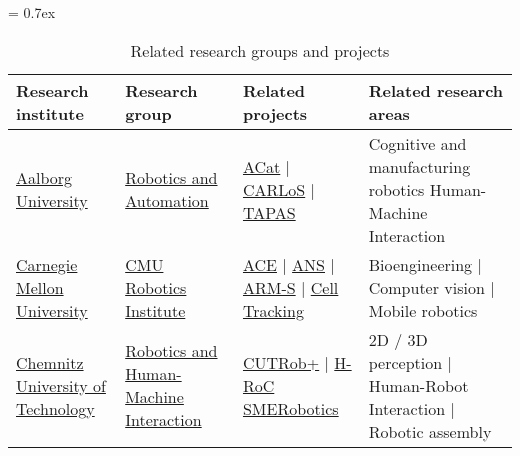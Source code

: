 \begin{table}[H]
	\caption{Related research groups and projects}
	\tabulinesep = 0.7ex
	\centering
	\scriptsize
	\begin{tabu} { X[m,c] X[0.9,m,c] X[1.2,m,c] X[1.8,m,c] }
		\rowfont{\bfseries\itshape} Research institute & Research group & Related projects & Related research areas \\
		\hline
		\href{http://www.en.aau.dk}{Aalborg University} &
		\href{http://robotics-automation.aau.dk}{Robotics and Automation} &
		\href{http://www.acat-project.eu/}{ACat} | \href{http://carlosproject.eu/}{CARLoS} | \href{http://tapas-project.eu/}{TAPAS} &
		Cognitive and manufacturing robotics Human-Machine Interaction \\


		\tabucline[1pt on 1.5pt off 3pt]{-}
		\href{http://www.cmu.edu}{Carnegie Mellon University} &
		\href{https://www.ri.cmu.edu}{CMU Robotics Institute} &
		\href{http://www.frc.ri.cmu.edu/projects/ace}{ACE} | \href{https://www.ri.cmu.edu/research_project_detail.html?project_id=550\&menu_id=261}{ANS} | \href{http://www.nrec.ri.cmu.edu/projects/arms}{ARM-S} | \href{https://www.ri.cmu.edu/research_project_detail.html?project_id=579\&menu_id=261}{Cell Tracking} &
		Bioengineering | Computer vision | Mobile robotics \\

		\tabucline[1pt on 1.5pt off 3pt]{-}
		\href{https://www.tu-chemnitz.de}{Chemnitz University of Technology} &
		\href{https://www.tu-chemnitz.de/etit/robosys/index.php.en}{Robotics and Human-Machine Interaction} &
		\href{http://www.euroc-project.eu/index.php?id=challenger_cutrob}{CUTRob+} | \href{http://www.drematrix.de/projects/hroc-human-robot-cooperation/}{H-RoC} \href{http://www.smerobotics.org/AUTOMATICA/exhibit-02-2016.html}{SMERobotics} &
		2D / 3D perception | Human-Robot Interaction | Robotic assembly \\



\end{tabu}
\end{table}
